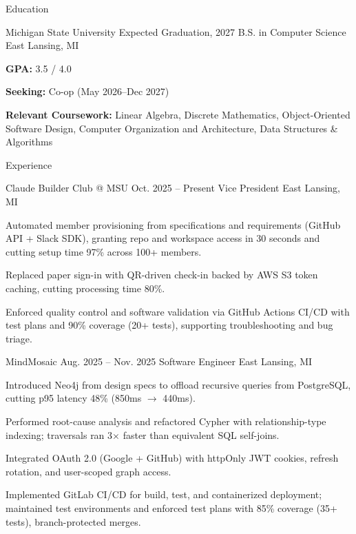\documentclass[
	11pt
]{../../../resume}
\begin{document}
	\begin{rSection}{E}{ducation}
		\begin{rSectionEntry}
			{Michigan State University}
			{Expected Graduation, 2027}
			{B.S. in Computer Science}
			{}
			{East Lansing, MI}

			\item \textbf{GPA:} 3.5 / 4.0
			\item \textbf{Seeking:} Co-op (May 2026--Dec 2027)
			\item \textbf{Relevant Coursework:} Linear Algebra, Discrete Mathematics, Object-Oriented Software Design, Computer Organization and Architecture, Data Structures \& Algorithms
		\end{rSectionEntry}
	\end{rSection}

	\begin{rSection}{E}{xperience}
		\begin{rSectionEntry}
			{Claude Builder Club @ MSU}
			{Oct. 2025 -- Present}
			{Vice President}
			{}
			{East Lansing, MI}

			\item Automated member provisioning from specifications and requirements (GitHub API + Slack SDK), granting repo and workspace access in 30 seconds and cutting setup time 97\% across 100+ members.
			\item Replaced paper sign-in with QR-driven check-in backed by AWS S3 token caching, cutting processing time 80\%.
			\item Enforced quality control and software validation via GitHub Actions CI/CD with test plans and 90\% coverage (20+ tests), supporting troubleshooting and bug triage.
		\end{rSectionEntry}

		\begin{rSectionEntry}
			{MindMosaic}
			{Aug. 2025 -- Nov. 2025}
			{Software Engineer}
			{}
			{East Lansing, MI}

			\item Introduced Neo4j from design specs to offload recursive queries from PostgreSQL, cutting p95 latency 48\% (850ms $\rightarrow$ 440ms).
			\item Performed root-cause analysis and refactored Cypher with relationship-type indexing; traversals ran 3$\times$ faster than equivalent SQL self-joins.
			\item Integrated OAuth 2.0 (Google + GitHub) with httpOnly JWT cookies, refresh rotation, and user-scoped graph access.
			\item Implemented GitLab CI/CD for build, test, and containerized deployment; maintained test environments and enforced test plans with 85\% coverage (35+ tests), branch-protected merges.
		\end{rSectionEntry}
	\end{rSection}
\end{document}
